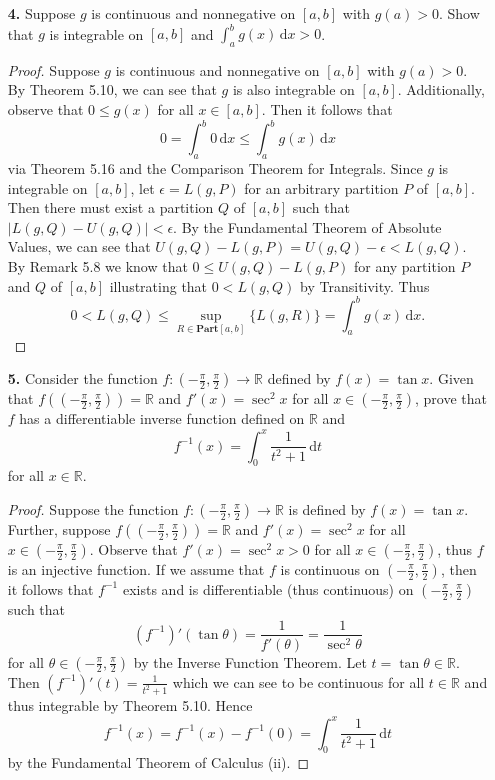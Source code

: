 \documentclass[ 12pt ]{article}
\begin{document}
\begin{enumerate}
	\item[\textbf{4.}] Suppose $g$ is continuous and nonnegative on $[a, b]$ with $g(a) > 0$. Show that $g$ is integrable on $[a, b]$ and $\int_a^b g(x)\, \mathrm{d}x > 0$.

	\begin{proof}
		Suppose $g$ is continuous and nonnegative on $[a, b]$ with $g(a) > 0$. By Theorem 5.10, we can see that $g$ is also integrable on $[a, b]$. Additionally,
		observe that $0 \leq g(x)$ for all $x \in [a, b]$. Then it follows that $$0 = \int_a^b 0\,\mathrm{d}x \leq \int_a^b g(x)\,\mathrm{d}x$$ via Theorem 5.16 and the Comparison Theorem
		for Integrals. Since $g$ is integrable on $[a, b]$, let $\epsilon = L(g, P)$ for an arbitrary partition $P$ of $[a, b]$. Then there must exist a partition $Q$ of
		$[a, b]$ such that $\left | L(g, Q) - U(g, Q) \right | < \epsilon$. By the Fundamental Theorem of Absolute Values, we can see that $U(g, Q) - L(g, P) = U(g, Q) -
		\epsilon < L(g, Q)$. By Remark 5.8 we know that $0 \leq U(g, Q) - L(g, P)$ for any partition $P$ and $Q$ of $[a, b]$ illustrating that $0 < L(g, Q)$ by Transitivity.
		Thus $$0 < L(g, Q) \leq \sup_{R \in \textbf{Part}[a, b]}\{L(g, R)\} = \int_a^b g(x)\,\mathrm{d}x.$$ 
	\end{proof}


	\item[\textbf{5.}] Consider the function $f: \left ( -\frac{\pi}{2}, \frac{\pi}{2} \right ) \rightarrow \mathbb{R}$ defined by $f(x) = \tan x$. Given that
		$f \left( \left ( -\frac{\pi}{2}, \frac{\pi}{2} \right ) \right) = \mathbb{R}$ and $f'(x) = \sec^2x$ for all $x \in \left ( -\frac{\pi}{2}, \frac{\pi}{2} \right )$,
		prove that $f$ has a differentiable inverse function defined on $\mathbb{R}$ and $$f^{-1}(x) = \int_0^x \frac{1}{t^2 + 1}\,\mathrm{d}t$$ for all $x \in \mathbb{R}$.

	\begin{proof}
		Suppose the function $f: \left ( -\frac{\pi}{2}, \frac{\pi}{2} \right ) \rightarrow \mathbb{R}$ is defined by $f(x) = \tan x$. Further, suppose
		$f \left( \left ( -\frac{\pi}{2}, \frac{\pi}{2} \right ) \right) = \mathbb{R}$ and $f'(x) = \sec^2x$ for all $x \in \left ( -\frac{\pi}{2}, \frac{\pi}{2} \right )$.
		Observe that $f'(x) = \sec^2x > 0$ for all $x \in \left ( -\frac{\pi}{2}, \frac{\pi}{2} \right )$, thus $f$ is an injective function. If we assume that $f$ is
		continuous on $\left ( -\frac{\pi}{2}, \frac{\pi}{2} \right )$, then it follows that $f^{-1}$ exists and is differentiable (thus continuous) on
		$\left ( -\frac{\pi}{2}, \frac{\pi}{2} \right )$ such that $$(f^{-1})'(\tan \theta) = \frac{1}{f'(\theta)} = \frac{1}{\sec^2 \theta}$$ for all $\theta \in
		\left ( -\frac{\pi}{2}, \frac{\pi}{2} \right )$ by the Inverse Function Theorem. Let $t = \tan \theta \in \mathbb{R}$. Then $(f^{-1})'(t) = \frac{1}{t^2 + 1}$ which
		we can see to be continuous for all $t \in \mathbb{R}$ and thus integrable by Theorem 5.10. Hence $$f^{-1}(x) = f^{-1}(x) - f^{-1}(0) = \int_0^x \frac{1}{t^2 + 1}\,\mathrm{d}t$$
		by the Fundamental Theorem of Calculus (ii).
	\end{proof}
	\newpage



\end{enumerate}
\end{document}
